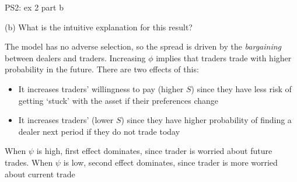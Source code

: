 \documentclass[english,10pt
,aspectratio=169
]{beamer}
\begin{document}
\begin{frame}{PS2: ex 2 part b}
	\begin{exampleblock}{}
		(b) What is the intuitive explanation for this result?
	\end{exampleblock}
	
	\pause
	
	The model has no adverse selection, so the spread is driven by the \textit{bargaining} between dealers and traders. Increasing $\phi$ implies that traders trade with higher probability in the future. There are two effects of this:
	\begin{itemize}
		\item It increases traders' \alert{willingness to pay} (higher $S$) since they have less risk of getting `stuck' with the asset if their preferences change
		\item It increases traders'  (lower $S$) since they have higher probability of finding a dealer next period if they do not trade today
	\end{itemize}
	When $\psi$ is high, first effect dominates, since trader is worried about future trades. When $\psi$ is low, second effect dominates, since trader is more worried about current trade
\end{frame}
\end{document}
